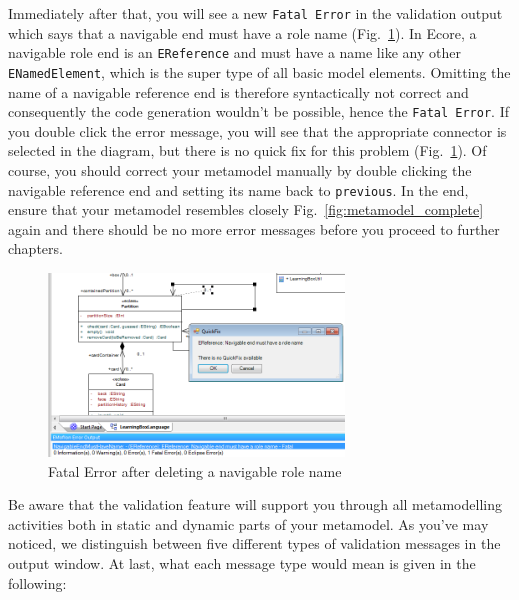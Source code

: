 Immediately after that, you will see a new \texttt{Fatal Error} in the validation output which says that a navigable end must have a role name (Fig.~\ref{fig:fatal-error}).
In Ecore, a navigable role end is an \texttt{EReference} and must have a name like any other \texttt{ENamedElement}, which is the super type of all basic model elements.
Omitting the name of a navigable reference end is therefore syntactically not correct and consequently the code generation wouldn't be possible, hence the \texttt{Fatal Error}. 
If you double click the error message, you will see that the appropriate connector is  selected in the diagram, but there is no quick fix for this problem (Fig.~\ref{fig:fatal-error}). 
Of course, you should correct your metamodel manually by double clicking the navigable reference end and setting its name back to \texttt{previous}. 
In the end, ensure that your metamodel resembles closely Fig.~\ref{fig:metamodel_complete} again and there should be no more error messages before you proceed to further chapters.

\begin{figure}[htbp]
	\centering
  \includegraphics[width=0.7\textwidth]{pics/memBoxBilder/memBox47} 
	\caption{Fatal Error after deleting a navigable role name}
	\label{fig:fatal-error}
\end{figure}

Be aware that the validation feature will support you through all metamodelling activities both in static and dynamic parts of your metamodel. 
As you've may noticed, we distinguish between five different types of validation messages in the output window. 
At last, what each message type would mean is given in the following:

